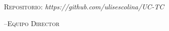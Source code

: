\documentclass{report}
\begin{document}
\begin{center}
  \textsc{Repositorio}: \textit{https://github.com/ulisescolina/UC-TC}
\end{center}

\hfill--\textsc{Equipo Director}
\tableofcontents
\listoffigures
\lstlistoflistings
{}
\newpage








\newpage
\printbibliography[title={Referencias}]
\end{document}

